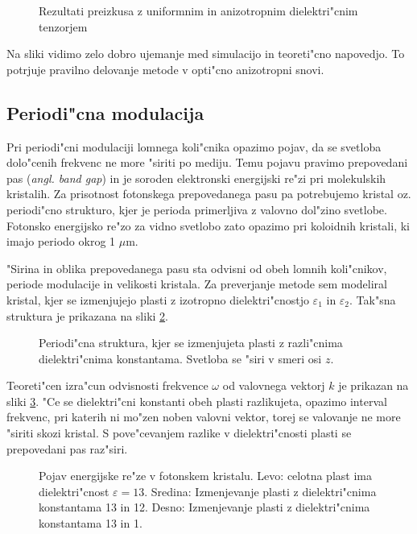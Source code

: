 \documentclass[a4paper,10pt]{article}
\newcommand{\angl}[1]{(\textit{angl. #1})}
\begin{document}
\begin{figure}[h]
 
 \caption{Rezultati preizkusa z uniformnim in anizotropnim dielektri"cnim tenzorjem}
 \label{fig:test-uniform}
\end{figure}

Na sliki vidimo zelo dobro ujemanje med simulacijo in teoreti"cno napovedjo. 
To potrjuje pravilno delovanje metode v opti"cno anizotropni snovi. 

\subsection{Periodi"cna modulacija}

Pri periodi"cni modulaciji lomnega koli"cnika opazimo pojav, da se svetloba dolo"cenih frekvenc ne more "siriti po mediju\cite{joannopoulos}. 
Temu pojavu pravimo prepovedani pas \angl{band gap} in je soroden elektronski energijski re"zi pri molekulskih kristalih. 
Za prisotnost fotonskega prepovedanega pasu pa potrebujemo kristal oz. periodi"cno strukturo, kjer je perioda primerljiva z valovno dol"zino svetlobe. 
Fotonsko energijsko re"zo za vidno svetlobo zato opazimo pri koloidnih kristali, ki imajo periodo okrog 1 $\mu$m. 

"Sirina in oblika prepovedanega pasu sta odvisni od obeh lomnih koli"cnikov, periode modulacije in velikosti kristala. 
Za preverjanje metode sem modeliral kristal, kjer se izmenjujejo plasti z izotropno dielektri"cnostjo $\varepsilon_1$ in $\varepsilon_2$. 
Tak"sna struktura je prikazana na sliki \ref{fig:periodic-structure}. 

\begin{figure}[h]
 \centering
 
 \caption{Periodi"cna struktura, kjer se izmenjujeta plasti z razli"cnima dielektri"cnima konstantama. 
 Svetloba se "siri v smeri osi $z$\cite{joannopoulos}. }
 \label{fig:periodic-structure}
\end{figure}

Teoreti"cen izra"cun odvisnosti frekvence $\omega$ od valovnega vektorj $k$ je prikazan na sliki \ref{fig:joannopoulos-crystal}. 
"Ce se dielektri"cni konstanti obeh plasti razlikujeta, opazimo interval frekvenc, pri katerih ni mo"zen noben valovni vektor, torej se valovanje ne more "siriti skozi kristal. 
S pove"cevanjem razlike v dielektri"cnosti plasti se prepovedani pas raz"siri. 

\begin{figure}[h]
\centering
  
 \caption{Pojav energijske re"ze v fotonskem kristalu. Levo: celotna plast ima dielektri"cnost $\varepsilon = 13$. Sredina: Izmenjevanje plasti z dielektri"cnima konstantama 13 in 12. Desno: Izmenjevanje plasti z dielektri"cnima konstantama 13 in 1. \cite{joannopoulos}}
 \label{fig:joannopoulos-crystal}
\end{figure}
\end{document}
